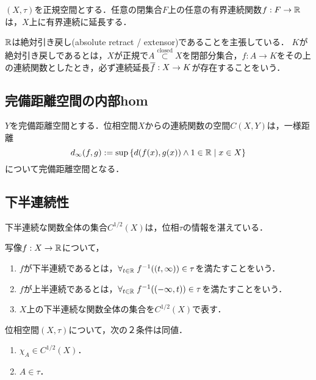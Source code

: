 \documentclass[uplatex,dvipdfmx]{jsreport}
\begin{document}
\begin{proposition}
    $(X,\tau)$を正規空間とする．任意の閉集合$F$上の任意の有界連続関数$f:F\to\mathbb{R}$は，$X$上に有界連続に延長する．
\end{proposition}
\begin{remarks}
    $\mathbb{R}$は絶対引き戻し(absolute retract / extensor)であることを主張している．
    $K$が絶対引き戻しであるとは，$X$が正規で$A\overset{\mathrm{closed}}{\subset}X$を閉部分集合，$f:A\to K$をその上の連続関数としたとき，必ず連続延長$\overline{f}:X\to K$が存在することをいう．
\end{remarks}

\subsection{完備距離空間の内部hom}

\begin{proposition}
    $Y$を完備距離空間とする．位相空間$X$からの連続関数の空間$C(X,Y)$は，一様距離
    \[d_\infty(f,g):=\sup\left\{d(f(x),g(x))\land 1\in\mathbb{R}\mid x\in X\right\}\]
    について完備距離空間となる．
\end{proposition}

\subsection{下半連続性}

\begin{tcolorbox}[colframe=ForestGreen, colback=ForestGreen!10!white,breakable,colbacktitle=ForestGreen!40!white,coltitle=black,fonttitle=\bfseries\sffamily,
title=]
    下半連続な関数全体の集合$C^{1/2}(X)$は，位相$\tau$の情報を湛えている．
\end{tcolorbox}

\begin{definition}
    写像$f:X\to\mathbb{R}$について，
    \begin{enumerate}
        \item $f$が下半連続であるとは，$\forall_{t\in\mathbb{R}}\;f^{-1}((t,\infty))\in\tau$を満たすことをいう．
        \item $f$が上半連続であるとは，$\forall_{t\in\mathbb{R}}\;f^{-1}((-\infty,t))\in\tau$を満たすことをいう．
        \item $X$上の下半連続な関数全体の集合を$C^{1/2}(X)$で表す．
    \end{enumerate}
\end{definition}

\begin{lemma}[位相の特徴付け]
    位相空間$(X,\tau)$について，次の２条件は同値．
    \begin{enumerate}
        \item $\chi_A\in C^{1/2}(X)$．
        \item $A\in\tau$．
    \end{enumerate}
\end{lemma}
\end{document}
